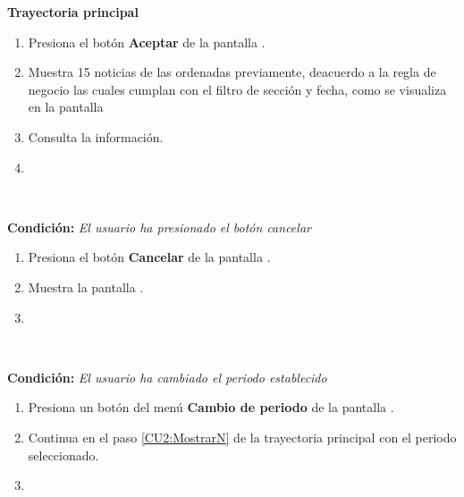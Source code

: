 

\begin{large}
	\textbf{Trayectoria principal}\\
\end{large}	

\begin{enumerate}[1.]

	\item \actor Presiona el botón 	\textbf{Aceptar} de la pantalla . 

	\item \sistema \label{CU2:MostrarN}Muestra 15 noticias de las ordenadas previamente, deacuerdo a la regla de negocio  las cuales cumplan con el filtro de sección y fecha,  como se visualiza en la pantalla  

	\item \actor \label{CU1:Consulta}Consulta la información.

	\item \finCU	
\end{enumerate}


\begin{large}
	\\
\end{large}	
\textbf{Condición:} \textit{El usuario ha presionado el botón cancelar}

\begin{enumerate}[{A-}1.]

	\item \actor Presiona el botón \textbf{Cancelar} de la pantalla .

	\item \sistema Muestra la pantalla .

	\item \finTA

\end{enumerate}


\begin{large}
	\\
\end{large}	
\textbf{Condición:} \textit{El usuario ha cambiado el periodo establecido}

\begin{enumerate}[{B-}1.]

	\item \actor Presiona un botón del menú \textbf{Cambio de periodo} de la pantalla .

	\item \sistema Continua en el paso \ref{CU2:MostrarN} de la trayectoria principal con el periodo seleccionado.

	\item \finTA

\end{enumerate}

